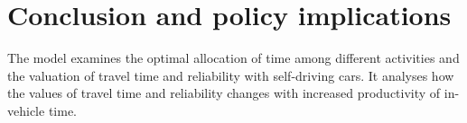 \documentclass[12pt,a4paper,british]{article}
\begin{document}
\section{Conclusion and policy implications}

The model examines the optimal allocation of time among different activities and the valuation of travel time and reliability with self-driving cars. It analyses how the values of travel time and reliability changes with increased productivity of in-vehicle time.

\clearpage

% 


\end{document}
